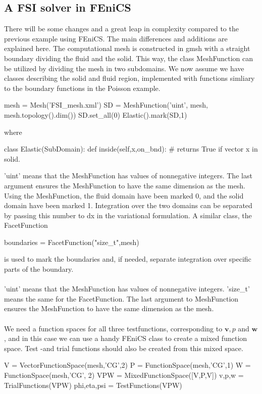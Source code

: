 \subsection{A FSI solver in FEniCS}
There will be some changes and a great leap in complexity compared to the previous example using FEniCS. The main differences and additions are explained here. The computational mesh is constructed in gmsh with a straight boundary dividing the fluid and the solid. This way, the class MeshFunction can be utilized by dividing the mesh in two subdomains. We now assume we have classes describing the solid and fluid region, implemented with functions simliary to the boundary functions in the Poisson example. 
\begin{cverbatim}
mesh = Mesh('FSI_mesh.xml')
SD = MeshFunction('uint', mesh, mesh.topology().dim())
SD.set_all(0)
Elastic().mark(SD,1)
\end{cverbatim}
where 
\begin{cverbatim}
class Elastic(SubDomain):
	def inside(self,x,on_bnd):
		# returns True if vector x in solid.
\end{cverbatim}
'uint' means that the MeshFunction has values of nonnegative integers. The last argument ensures the MeshFunction to have the same dimension as the mesh. \\
Using the MeshFunction, the fluid domain have been marked 0, and the solid domain have been marked 1. Integration over the two domains can be separated by passing this number to dx in the variational formulation. A similar class, the FacetFunction
\begin{cverbatim}
boundaries = FacetFunction("size_t",mesh)
\end{cverbatim}
is used to mark the boundaries and, if needed, separate integration over specific parts of the boundary.
\\
\\'uint' means that the MeshFunction has values of nonnegative integers. 'size\_t' means the same for the FacetFunction. The last argument to MeshFunction ensures the MeshFunction to have the same dimension as the mesh. 
\\ \\	
We need a function spaces for all three testfunctions, corresponding to $\mathbf{v}, p$ and $\mathbf{w}$, and in this case we can use a handy FEniCS class to create a mixed function space. Test -and trial functions should also be created from this mixed space.
\begin{cverbatim}
V = VectorFunctionSpace(mesh,'CG',2)
P = FunctionSpace(mesh,'CG',1)
W = FunctionSpace(mesh,'CG', 2)
VPW = MixedFunctionSpace([V,P,V])
v,p,w = TrialFunctions(VPW)
phi,eta,psi = TestFunctions(VPW)
\end{cverbatim}
